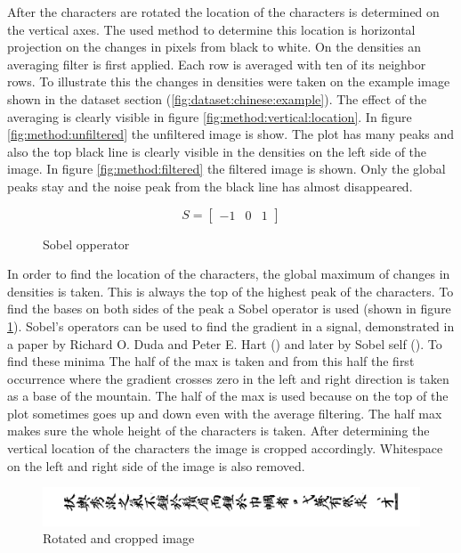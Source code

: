 After the characters are rotated the location of the characters is determined on the vertical axes. The used method to determine this location is horizontal projection on the changes in pixels from black to white. On the densities an averaging filter is first applied. Each row is averaged with ten of its neighbor rows. To illustrate this the changes in densities were taken on the example image shown in the dataset section (\ref{fig:dataset:chinese:example}). The effect of the averaging is clearly visible in figure \ref{fig:method:vertical:location}. In figure \ref{fig:method:unfiltered} the unfiltered image is show. The plot has many peaks and also the top black line is clearly visible in the densities on the left side of the image. In figure \ref{fig:method:filtered} the filtered image is shown. Only the global peaks stay and the noise peak from the black line has almost disappeared.


\begin{figure}[ht]
  \begin{minipage}{\linewidth}
    \centering
    \[S=\left[\begin{array}{ccc}
		-1 & 0 & 1
    \end{array}\right]\]
  \end{minipage}%
  \caption{Sobel opperator}
  \label{mat:method:sobel}
\end{figure}

In order to find the location of the characters, the global maximum of changes in densities is taken. This is always the top of the highest peak of the characters. To find the bases on both sides of the peak a Sobel operator is used (shown in figure \ref{mat:method:sobel}). Sobel's operators can be used to find the gradient in a signal, demonstrated in a paper by Richard O. Duda and Peter E. Hart (\cite{Duda}) and later by Sobel self (\cite{Sobel}). To find these minima The half of the max is taken and from this half the first occurrence where the gradient crosses zero in the left and right direction is taken as a base of the mountain. The half of the max is used because on the top of the plot sometimes goes up and down even with the average filtering. The half max makes sure the whole height of the characters is taken. After determining the vertical location of the characters the image is cropped accordingly. Whitespace on the left and right side of the image is also removed.

\begin{figure}[ht]
  \centering
  \includegraphics[width=\textwidth]{./images/method/trimmed.png}
  \caption{Rotated and cropped image}
  \label{fig:method:vertical:cropped}
\end{figure}

